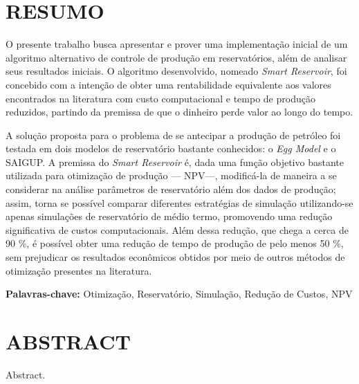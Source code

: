 
\chapter[RESUMO]{RESUMO}
{O presente trabalho busca apresentar e prover uma implementa\c{c}\~{a}o inicial de um algoritmo alternativo de controle de produ\c{c}\~{a}o em reservat\'{o}rios, al\'{e}m de analisar seus resultados iniciais. O algoritmo desenvolvido, nomeado \textit{Smart Reservoir}, foi concebido com a inten\c{c}\~{a}o de obter uma rentabilidade equivalente aos valores encontrados na literatura com custo computacional e tempo de produ\c{c}\~{a}o reduzidos, partindo da premissa de que o dinheiro perde valor ao longo do tempo. 

A solu\c{c}\~{a}o proposta para o problema de se antecipar a produ\c{c}\~{a}o de petr\'{o}leo foi testada em dois modelos de reservat\'{o}rio bastante conhecidos: o \textit{Egg Model} e o SAIGUP. A premissa do \textit{Smart Reservoir} \'{e}, dada uma fun\c{c}\~{a}o objetivo bastante utilizada para otimiza\c{c}\~{a}o de produ\c{c}\~{a}o --- NPV---, modific\'{a}-la de maneira a se considerar na an\'{a}lise par\^{a}metros de reservat\'{o}rio al\'{e}m dos dados de produ\c{c}\~{a}o; assim, torna se poss\'{i}vel comparar diferentes estrat\'{e}gias de simula\c{c}\~{a}o utilizando-se apenas simula\c{c}\~{o}es de reservat\'{o}rio de m\'{e}dio termo, promovendo uma redu\c{c}\~{a}o significativa de custos computacionais. Al\'{e}m dessa redu\c{c}\~{a}o, que chega a cerca de 90 \%,  \'{e} poss\'{i}vel obter uma redu\c{c}\~{a}o de tempo de produ\c{c}\~{a}o de pelo menos 50 \%, sem prejudicar os resultados econ\^{o}micos obtidos por meio de outros m\'{e}todos de otimiza\c{c}\~{a}o presentes na literatura.

\textbf{Palavras-chave:} Otimiza\c{c}\~{a}o, Reservat\'{o}rio, Simula\c{c}\~{a}o, Redu\c{c}\~{a}o de Custos, NPV
}

\vspace*{2cm}

\newpage

\chapter[ABSTRACT]{ABSTRACT}
{Abstract.}